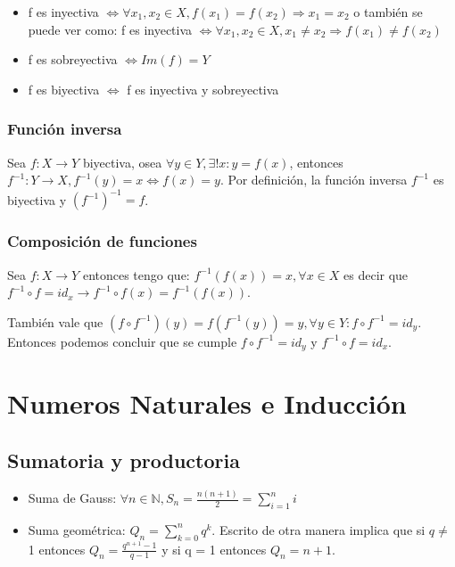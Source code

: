 \documentclass{report}
\begin{document}
\begin{itemize}
    \item f es inyectiva \begin{math}
        \iff \forall x_1,x_2 \in X, f(x_1)=f(x_2) \Rightarrow x_1 = x_2
    \end{math} o también se puede ver como: f es inyectiva
    \begin{math}
        \iff \forall x_1,x_2 \in X, x_1 \neq x_2 \Rightarrow f(x_1) \neq f(x_2)
    \end{math}
    \item f es sobreyectiva $\iff Im(f) = Y$
    \item f es biyectiva $\iff$ f es inyectiva y sobreyectiva
\end{itemize}

\subsection{Función inversa}
Sea $f:X \rightarrow Y$ biyectiva, osea $\forall y \in Y, \exists!x: y = f(x)$, entonces $f^{-1}:Y \rightarrow X, f^{-1}(y) = x \iff f(x) = y$. Por definición, la función inversa $f^{-1}$ es biyectiva y $(f^{-1})^{-1} = f$.

\subsection{Composición de funciones}
Sea $f:X \rightarrow Y$ entonces tengo que: $f^{-1}(f(x)) = x, \forall x \in X$ es decir que $f^{-1}\circ f = id_x \rightarrow f^{-1}\circ f(x) = f^{-1}(f(x))$. 

También vale que  $(f\circ f^{-1})(y) = f(f^{-1}(y)) = y, \forall y \in Y: f\circ f^{-1}=id_y$. Entonces podemos concluir que se cumple $f\circ f^{-1} = id_y$ y $f^{-1}\circ f = id_x$.

\chapter{Numeros Naturales e Inducción}
\section{Sumatoria y productoria}
\begin{itemize}
    \item Suma de Gauss: \begin{math}
        \forall n \in \mathbb{N}, S_n = \frac{n(n+1)}{2} = \sum_{i=1}^{n} i
    \end{math}
    \item Suma geométrica: \begin{math}
        Q_n = \sum_{k=0}^n q^k 
    \end{math}. Escrito de otra manera implica que si $q \neq$ 1 entonces \begin{math}
        Q_n = \frac{q^{n+1} - 1}{q-1}
    \end{math} y si q = 1 entonces $Q_n = n + 1$.
\end{itemize}
\end{document}
